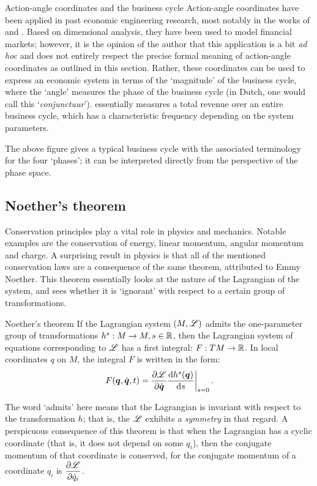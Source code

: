\begin{econ}{Action-angle coordinates and the business cycle}
    Action-angle coordinates have been applied in past economic engineering research, most notably in the works of \citet{VanArdenne2020} and \citet{Vos2019}. Based on dimensional analysis, they have been used to model financial markets; however, it is the opinion of the author that this application is a bit \emph{ad hoc} and does not entirely respect the precise formal meaning of action-angle coordinates as outlined in this section. Rather, these coordinates can be used to express an economic system in terms of the `magnitude' of the business cycle, where the `angle' measures the phase of the business cycle (in Dutch, one would call this `\emph{conjunctuur}').  essentially measures a total revenue over an entire business cycle, which has a characteristic frequency depending on the system parameters.
    \begin{center}
        
    \end{center}
    The above figure gives a typical business cycle with the associated terminology for the four `phases'; it can be interpreted directly from the perspective of the phase space. 
\end{econ}

\subsection{Noether's theorem}
\label{ssec:noether}
Conservation principles play a vital role in physics and mechanics. Notable examples are the conservation of energy, linear momentum, angular momentum and charge. A surprising result in physics is that all of the mentioned conservation laws are a consequence of the same theorem, attributed to Emmy Noether. This theorem essentially looks at the nature of the Lagrangian of the system, and sees whether it is `ignorant' with respect to a certain group of transformations.

\begin{thmblock}{Noether's theorem}
    If the Lagrangian system $(M, \mathscr{L})$ admits the one-parameter group of transformations $h^s: M \to M, s \in \mathbb{R}$, then the Lagrangian system of equations corresponding to $\mathscr{L}$ has a first integral: $F: TM \to \mathbb{R}$. In local coordinates $q$ on $M$, the integral $F$ is written in the form: \cite{Arnold1989}
    $$ \left. F(\vb*{q}, \dot{\vb*{q}}, t) = \pdv{\ensuremath{\mathscr{L}}}{\ensuremath{\dot{\vb*{q}}}}\dv{h^s(\ensuremath{\vb*{q}})}{s}\right |_{s = 0}. $$
\end{thmblock}
The word `admits' here means that the Lagrangian is invariant with respect to the transformation $h$; that is, the $\mathscr{L}$ exhibits a \emph{symmetry} in that regard. A perspicuous consequence of this theorem is that when the Lagrangian has a cyclic coordinate (that is, it does not depend on some $q_i$), then the conjugate momentum of that coordinate is conserved, for the conjugate momentum of a coordinate $q_i$ is $\displaystyle\pdv{\ensuremath{\mathscr{L}}}{\dot{q}_i}$.

